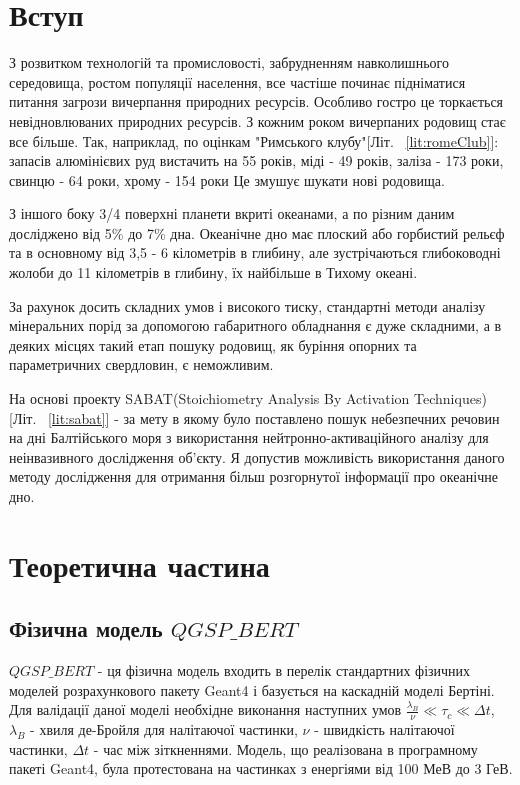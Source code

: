 \documentclass[a4paper, 14pt]{article}
\numberwithin{equation}{section}
\numberwithin{table}{section}
\begin{document}
\section{Вступ}

З розвитком технологій та промисловості, забрудненням навколишнього середовища, ростом популяції населення, все частіше починає підніматися питання загрози вичерпання природних ресурсів. Особливо гостро це торкається невідновлюваних природних ресурсів. З кожним роком вичерпаних родовищ стає все більше. Так, наприклад, по оцінкам "Римського клубу"[Літ. ~\ref{lit:romeClub}]: запасів алюмінієвих руд вистачить на 55 років, міді - 49 років, заліза - 173 роки, свинцю - 64 роки, хрому - 154 роки Це змушує шукати нові родовища.

З іншого боку 3/4 поверхні планети вкриті океанами, а по різним даним досліджено від 5\% до 7\% дна.
Океанічне дно має плоский або горбистий рельєф та в основному від 3,5 - 6 кілометрів в глибину, але зустрічаються глибоководні жолоби до 11 кілометрів в глибину, їх найбільше в Тихому океані. 

За рахунок досить складних умов і високого тиску, стандартні методи аналізу мінеральних порід за допомогою габаритного обладнання є дуже складними, а в деяких місцях такий етап пошуку родовищ, як буріння опорних та параметричних свердловин, є неможливим.

На основі проекту SABAT(Stoichiometry Analysis By Activation Techniques)[Літ. ~\ref{lit:sabat}] - за мету в якому було поставлено пошук небезпечних речовин на дні Балтійського моря з використання нейтронно-активаційного аналізу для неінвазивного дослідження об'єкту. Я допустив можливість використання даного методу дослідження для отримання більш розгорнутої інформації про океанічне дно.		

\newpage
\section{Теоретична частина}
\setcounter{figure}{0} 
\subsection{Фізична модель $QGSP\_BERT$}
$QGSP\_BERT$ - ця фізична модель входить в перелік стандартних фізичних моделей розрахункового пакету Geant4 і базується на каскадній моделі Бертіні. Для валідації даної моделі необхідне виконання наступних умов $\frac{\lambda_B}{\nu} \ll \tau_c \ll \Delta{t}$, $\lambda_B$ - хвиля де-Бройля для налітаючої частинки, $\nu$ - швидкість налітаючої частинки, $\Delta{t}$ - час між зіткненнями. 
Модель, що реалізована в програмному пакеті Geant4, була протестована на частинках з енергіями від 100 МеВ до 3 ГеВ.
\end{document}
